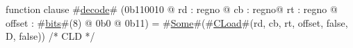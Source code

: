 function clause #\hyperref[zdecode]{decode}# (0b110010 @ rd : regno @ cb : regno@ rt : regno @ offset : #\hyperref[zbits]{bits}#(8) @ 0b0 @ 0b11) = #\hyperref[zSome]{Some}#(#\hyperref[zCLoad]{CLoad}#(rd, cb, rt, offset, false, D, false)) /* CLD */
